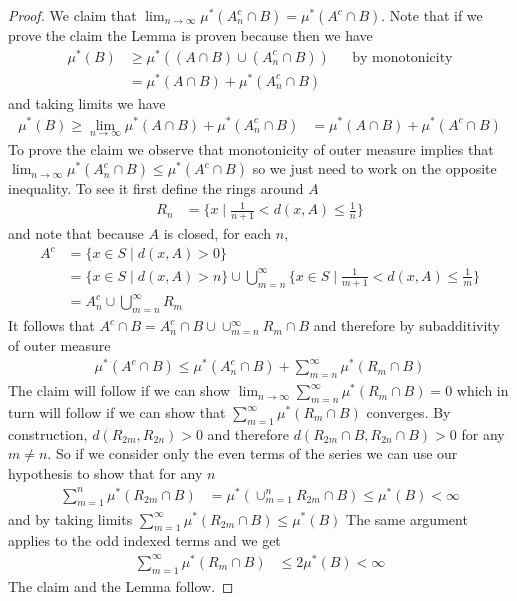 \begin{proof}
We claim that $\lim_{n \to \infty} \mu^*(A_n^c \cap B) = \mu^*(A^c
\cap B)$.  Note that if we prove the claim the Lemma is proven because then we have
\begin{align*}
\mu^*(B) &\geq \mu^*((A
\cap B) \cup (A_n^c \cap B)) & & \text{by monotonicity}\\
&= \mu^*(A \cap B) +
\mu^*(A_n^c \cap B)
\end{align*}
and taking limits we have 
\begin{align*}
\mu^*(B) \geq \lim_{n\to \infty} \mu^*(A \cap B) +
\mu^*(A_n^c \cap B) &= \mu^*(A \cap B) +
\mu^*(A^c \cap B)
\end{align*}
To prove the claim we observe that monotonicity of outer measure
implies that $\lim_{n \to \infty} \mu^*(A_n^c \cap B) \leq \mu^*(A^c
\cap B)$ so we just need to
work on the opposite inequality.  To see it first define the rings
around $A$
\begin{align*}
R_n &= \lbrace x \mid \frac{1}{n+1} < d(x, A) \leq \frac{1}{n} \rbrace
\end{align*}
and note that because $A$ is closed, for each $n$,
\begin{align*}
A^c &= \lbrace x \in S \mid d(x, A) > 0 \rbrace \\
&=\lbrace x \in S \mid d(x, A) > n \rbrace \cup \bigcup_{m=n}^\infty \lbrace
x \in S \mid \frac{1}{m+1} < d(x, A) \leq \frac{1}{m} \rbrace \\
&=A_n^c \cup \bigcup_{m=n}^\infty R_m
\end{align*}
It follows that
$A^c \cap B = A_n^c \cap B \cup \cup_{m=n}^\infty
R_m \cap B$ and therefore by subadditivity of outer measure 
\begin{align*}
\mu^*(A^c \cap B) \leq \mu^*(A_n^c \cap B) + \sum_{m=n}^\infty
\mu^*(R_m \cap B)
\end{align*}
The claim will follow if we can show $\lim_{n \to \infty} \sum_{m=n}^\infty
\mu^*(R_m \cap B)=0$ which in turn will follow if we can show that $\sum_{m=1}^\infty
\mu^*(R_m \cap B)$ converges.  By construction, $d(R_{2m}, R_{2n})
> 0$ and therefore $d(R_{2m} \cap B, R_{2n} \cap B)
> 0$ for any $m \neq n$.  So if we consider only the even terms of the
series we can use our hypothesis to show that for any $n$
\begin{align*}
\sum_{m=1}^n \mu^*(R_{2m} \cap B) &= \mu^*(\cup_{m=1}^n
R_{2m} \cap B) \leq \mu^*(B) < \infty
\end{align*}
and by taking limits $\sum_{m=1}^\infty \mu^*(R_{2m} \cap B) \leq \mu^*(B)$
The same argument applies to the odd indexed terms and we get
\begin{align*}
\sum_{m=1}^\infty \mu^*(R_{m} \cap B) &\leq 2\mu^*(B) < \infty
\end{align*}
The claim and the Lemma follow.
\end{proof}


